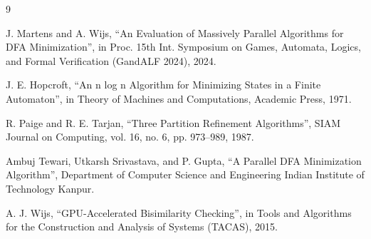 \begin{thebibliography}{9}

J. Martens and A. Wijs,
``An Evaluation of Massively Parallel Algorithms for DFA Minimization'',
in Proc. 15th Int. Symposium on Games, Automata, Logics, and Formal Verification (GandALF 2024), 2024.

J. E. Hopcroft,
``An n log n Algorithm for Minimizing States in a Finite Automaton'',
in Theory of Machines and Computations,
Academic Press, 1971.

R. Paige and R. E. Tarjan,
``Three Partition Refinement Algorithms'',
SIAM Journal on Computing,
vol. 16, no. 6, pp. 973--989, 1987.

Ambuj Tewari, Utkarsh Srivastava, and P. Gupta, ``A Parallel DFA Minimization Algorithm'', Department of Computer Science and Engineering Indian Institute of Technology Kanpur.

A. J. Wijs,
``GPU-Accelerated Bisimilarity Checking'',
in Tools and Algorithms for the Construction and Analysis of Systems (TACAS), 2015.

\end{thebibliography}
